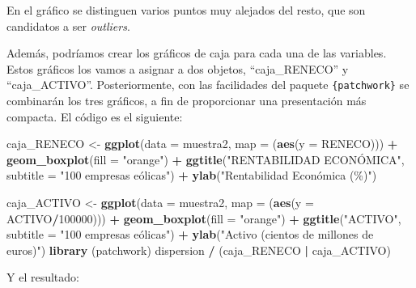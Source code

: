 \documentclass[
]{book}
\newenvironment{Shaded}{\begin{snugshade}}{\end{snugshade}}
\newcommand{\AttributeTok}[1]{\textcolor[rgb]{0.13,0.29,0.53}{#1}}
\newcommand{\DecValTok}[1]{\textcolor[rgb]{0.00,0.00,0.81}{#1}}
\newcommand{\FunctionTok}[1]{\textcolor[rgb]{0.13,0.29,0.53}{\textbf{#1}}}
\newcommand{\NormalTok}[1]{#1}
\newcommand{\OtherTok}[1]{\textcolor[rgb]{0.56,0.35,0.01}{#1}}
\newcommand{\SpecialCharTok}[1]{\textcolor[rgb]{0.81,0.36,0.00}{\textbf{#1}}}
\newcommand{\StringTok}[1]{\textcolor[rgb]{0.31,0.60,0.02}{#1}}
\begin{document}
En el gráfico se distinguen varios puntos muy alejados del resto, que son candidatos a ser \emph{outliers}.

Además, podríamos crear los gráficos de caja para cada una de las variables. Estos gráficos los vamos a asignar a dos objetos, ``caja\_RENECO'' y ``caja\_ACTIVO''. Posteriormente, con las facilidades del paquete \texttt{\{patchwork\}} se combinarán los tres gráficos, a fin de proporcionar una presentación más compacta. El código es el siguiente:

\begin{Shaded}
\begin{Highlighting}[]
\NormalTok{caja\_RENECO }\OtherTok{\textless{}{-}} \FunctionTok{ggplot}\NormalTok{(}\AttributeTok{data =}\NormalTok{ muestra2, }\AttributeTok{map =}\NormalTok{ (}\FunctionTok{aes}\NormalTok{(}\AttributeTok{y =}\NormalTok{ RENECO))) }\SpecialCharTok{+}
               \FunctionTok{geom\_boxplot}\NormalTok{(}\AttributeTok{fill =} \StringTok{"orange"}\NormalTok{) }\SpecialCharTok{+}
               \FunctionTok{ggtitle}\NormalTok{(}\StringTok{"RENTABILIDAD ECONÓMICA"}\NormalTok{,}
                       \AttributeTok{subtitle =} \StringTok{"100 empresas eólicas"}\NormalTok{) }\SpecialCharTok{+}
               \FunctionTok{ylab}\NormalTok{(}\StringTok{"Rentabilidad Económica (\%)"}\NormalTok{)}

\NormalTok{caja\_ACTIVO }\OtherTok{\textless{}{-}} \FunctionTok{ggplot}\NormalTok{(}\AttributeTok{data =}\NormalTok{ muestra2, }\AttributeTok{map =}\NormalTok{ (}\FunctionTok{aes}\NormalTok{(}\AttributeTok{y =}\NormalTok{ ACTIVO}\SpecialCharTok{/}\DecValTok{100000}\NormalTok{))) }\SpecialCharTok{+}
               \FunctionTok{geom\_boxplot}\NormalTok{(}\AttributeTok{fill =} \StringTok{"orange"}\NormalTok{) }\SpecialCharTok{+}
               \FunctionTok{ggtitle}\NormalTok{(}\StringTok{"ACTIVO"}\NormalTok{,}
                       \AttributeTok{subtitle =} \StringTok{"100 empresas eólicas"}\NormalTok{) }\SpecialCharTok{+}
               \FunctionTok{ylab}\NormalTok{(}\StringTok{"Activo (cientos de millones de euros)"}\NormalTok{)}
\FunctionTok{library}\NormalTok{ (patchwork)}
\NormalTok{dispersion }\SpecialCharTok{/}\NormalTok{ (caja\_RENECO }\SpecialCharTok{|}\NormalTok{ caja\_ACTIVO)}
\end{Highlighting}
\end{Shaded}

Y el resultado:
\end{document}
